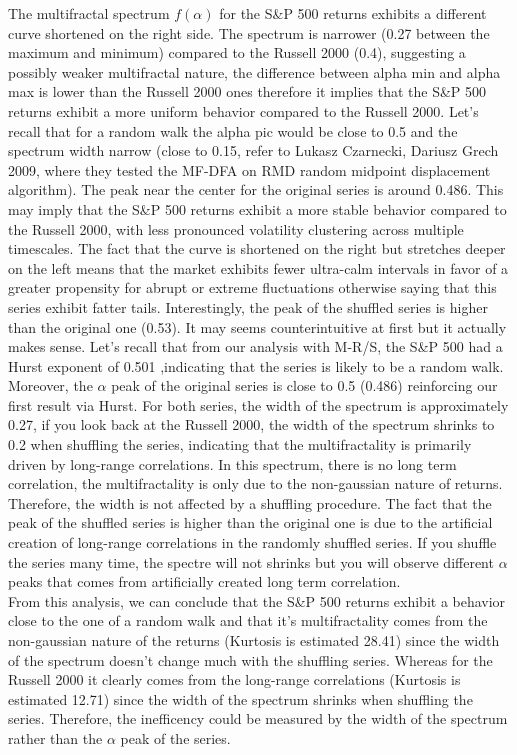 \documentclass[11pt]{extarticle}
\begin{document}
The multifractal spectrum $f(\alpha)$ for the S\&P 500 returns exhibits a different curve shortened on the right side.
The spectrum is narrower (0.27 between the maximum and minimum) compared to the Russell 2000 (0.4),
suggesting a possibly weaker multifractal nature, the difference between alpha min and alpha max is lower than the Russell 2000 ones
therefore it implies that the S\&P 500 returns exhibit a more uniform behavior compared to the Russell 2000. Let's recall that for
a random walk the alpha pic would be close to 0.5 and the spectrum width narrow (close to 0.15, refer to Lukasz Czarnecki, Dariusz Grech 2009,
where they tested the MF-DFA on RMD random midpoint displacement algorithm).
The peak near the center for the original series is around 0.486. This may imply that the S\&P 500 returns exhibit a more stable
behavior compared to the Russell 2000, with less pronounced volatility clustering across multiple timescales.
The fact that the curve is shortened on the right but stretches deeper on the left means that the market exhibits fewer
ultra-calm intervals in favor of a greater propensity for abrupt or extreme fluctuations otherwise saying that this series
exhibit fatter tails.
Interestingly, the peak of the shuffled series is higher than the original one (0.53). It may seems counterintuitive at first
but it actually makes sense. Let's recall that from our analysis with M-R/S, the S\&P 500 had a Hurst exponent of 0.501
,indicating that the series is likely to be a random walk. Moreover, the $\alpha$ peak of the original series is close to 0.5 (0.486)
reinforcing our first result via Hurst.
For both series, the width of the spectrum is approximately 0.27, if you look back at the Russell 2000, the width of the spectrum
shrinks to 0.2 when shuffling the series, indicating that the multifractality is primarily driven by long-range correlations.
In this spectrum, there is no long term correlation, the multifractality is only due to the non-gaussian nature of returns.
Therefore, the width is not affected by a shuffling procedure. The fact that the peak of the shuffled series is higher than the original one
is due to the artificial creation of long-range correlations in the randomly shuffled series. If you shuffle the series many time,
the spectre will not shrinks but you will observe different $\alpha$ peaks that comes from artificially created long term correlation. \\

From this analysis, we can conclude that the S\&P 500 returns exhibit a behavior close to the one of a random walk and
that it's multifractality comes from the non-gaussian nature of the returns (Kurtosis is estimated 28.41) since the width
of the spectrum doesn't change much with the shuffling series. Whereas for the Russell 2000 it clearly comes from the long-range
correlations (Kurtosis is estimated 12.71) since the width of the spectrum shrinks when shuffling the series.
Therefore, the inefficency could be measured by the width of the spectrum rather than the $\alpha$ peak of the series.
\end{document}
